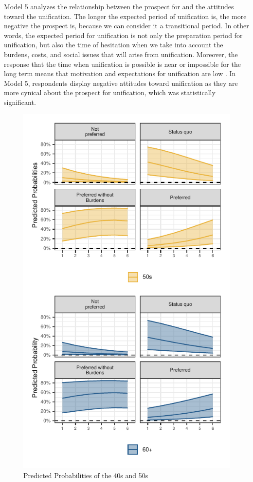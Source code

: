 \documentclass[letterpaper,9pt,twocolumn,twoside,]{pinp}
\begin{document}
Model 5 analyzes the relationship between the prospect for and the
attitudes toward the unification. The longer the expected period of
unification is, the more negative the prospect is, because we can
consider it a transitional period. In other words, the expected period
for unification is not only the preparation period for unification, but
also the time of hesitation when we take into account the burdens,
costs, and social issues that will arise from unification. Moreover, the
response that the time when unification is possible is near or
impossible for the long term means that motivation and expectations for
unification are low \citep[82]{Jeong2013}. In Model 5, respondents
display negative attitudes toward unification as they are more cynical
about the prospect for unification, which was statistically significant.

\begin{figure}[htbp]

{\centering \includegraphics{manuscript_files/figure-latex/fig10-1} 

}

\caption{\label{fig10} Predicted Probabilities of the 40s and 50s}\label{fig:fig10}
\end{figure}
\end{document}

